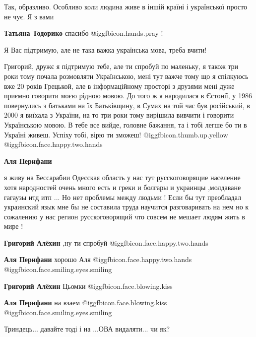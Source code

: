 \begin{itemize}
Так, образливо. Особливо коли людина живе в іншій країні і української просто не чує. Я з вами

\begin{itemize} %
\textbf{Татьяна Тодорико} спасибо  @igg{fbicon.hands.pray}  !
\end{itemize} %

Я Вас підтримую, але не така важка українська мова, треба вчити!


Григорий, дружє я підтримую тебе, але ти спробуй по маленьку, я також три роки
тому почала розмовляти Українською, мені тут важче тому що я спілкуюсь вже 20
років Грецькой, але в інформаційному просторі з друзями мені дуже приємно
говорити моєю рідною мовою. До того ж я народилася в Єстонії, у 1986 повернулись
з батьками на їх Батьківщину, в Сумах на той час був російський, в 2000 я
виїхала з України, на то три роки тому вирішила вивчити і говорити Українською
мовою. В тебе все вийде, головне бажання, та і тобі легше бо ти в Україні
живеш. Успіху тобі, вірю ти зможеш! @igg{fbicon.thumb.up.yellow}  @igg{fbicon.face.happy.two.hands} 

\begin{itemize} %
\textbf{Аля Перифани} 

я живу на Бессарабии Одесская область у нас тут русскоговорящие население хотя
народностей очень много есть и греки и болгары и украинцы ,молдаване гагаузы
итд итп ... Но нет проблемы между людьми ! Если бы тут преобладал украинский
язык мне бы не составила труда научится разговаривать на нем но к сожалению у
нас регион русскоговорящий что совсем не мешает людям жить в мире !

\textbf{Григорий Алёхин} ,ну ти спробуй  @igg{fbicon.face.happy.two.hands} 

\textbf{Аля Перифани} хорошо Аля  @igg{fbicon.face.happy.two.hands}  @igg{fbicon.face.smiling.eyes.smiling} 

\textbf{Григорий Алёхин} Цьомки  @igg{fbicon.face.blowing.kiss} 

\textbf{Аля Перифани} на взаем  @igg{fbicon.face.blowing.kiss}  @igg{fbicon.face.smiling.eyes.smiling} 
\end{itemize} %

Триндець... давайте тоді і на ...ОВА видаляти... чи як?


\end{itemize}
